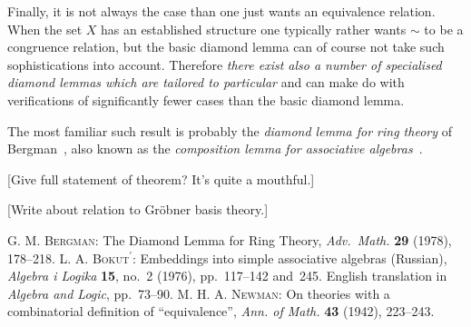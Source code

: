 \documentclass[12pt]{article}
\theoremstyle{definition}
\providecommand{\cprime}{\ensuremath{{}^\prime}}
\begin{document}
Finally, it is not always the case than one just wants an equivalence 
relation. When the  set $X$ has an 
established  structure one typically 
rather wants $\sim$ to be a congruence 
relation, but the basic diamond lemma can of course not take such 
sophistications into account. Therefore \emph{there exist also a number 
of specialised diamond lemmas which are tailored to particular 
} 
and can make do with verifications of significantly fewer 
cases than the basic diamond lemma.

\medskip

The most familiar such result is probably the \emph{diamond lemma for 
ring theory} of Bergman~\cite{Bergman}, also known as the 
\emph{composition lemma for associative algebras}~\cite{Bokut}.

\bigskip

[Give full statement of theorem? It's quite a mouthful.]

[Write about relation to Gr\"obner basis theory.]



\begin{thebibliography}{9}
%
   \textsc{G. M. Bergman}: 
   The Diamond Lemma for Ring Theory, 
   \textit{Adv.\ Math.} \textbf{29} (1978), 178--218.
%
   \textsc{L. A. Bokut\cprime}:
   Embeddings into simple associative algebras (Russian),
   \textit{Algebra i Logika} \textbf{15}, no.~2 (1976), 
   pp.~117--142 and~245.
   English translation in \textit{Algebra and Logic}, pp.~73--90.
%
   \textsc{M. H. A. Newman}: 
   On theories with a combinatorial definition of ``equivalence'', 
   \textit{Ann. of Math.} \textbf{43} (1942), 223--243.
%
\end{thebibliography}
\end{document}

